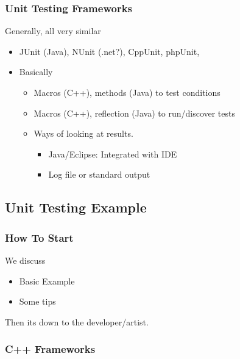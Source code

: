 \subsubsection{Unit Testing Frameworks}\label{unit-testing-frameworks}

Generally, all very similar

\begin{itemize}
\itemsep1pt\parskip0pt
\item
  JUnit (Java), NUnit (.net?), CppUnit, phpUnit,
\item
  Basically

  \begin{itemize}
  \itemsep1pt\parskip0pt
  \item
    Macros (C++), methods (Java) to test conditions
  \item
    Macros (C++), reflection (Java) to run/discover tests
  \item
    Ways of looking at results.

    \begin{itemize}
    \itemsep1pt\parskip0pt
    \item
      Java/Eclipse: Integrated with IDE
    \item
      Log file or standard output
    \end{itemize}
  \end{itemize}
\end{itemize}

\subsection{Unit Testing Example}\label{unit-testing-example}

\subsubsection{How To Start}\label{how-to-start}

We discuss

\begin{itemize}
\itemsep1pt\parskip0pt
\item
  Basic Example
\item
  Some tips
\end{itemize}

Then its down to the developer/artist.

\subsubsection{C++ Frameworks}\label{c-frameworks}

